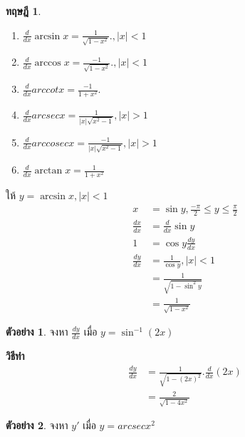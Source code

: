 \documentclass[
]{book}
\newtheorem{theorem}{ทฤษฎี}[chapter]
\theoremstyle{definition}
\theoremstyle{definition}
\newtheorem{example}{ตัวอย่าง}[chapter]
\theoremstyle{definition}
\theoremstyle{definition}
\theoremstyle{remark}
\begin{document}
\begin{theorem}
\leavevmode

\begin{enumerate}
\def\labelenumi{\arabic{enumi}.}
\item
  \(\displaystyle\frac{d}{dx} \arcsin x=\frac{1}{\sqrt{1-x^{2}}}., |x|<1\)
\item
  \(\displaystyle\frac{d}{dx} \arccos x=\frac{-1}{\sqrt{1-x^{2}}}., |x|<1\)
\item
  \(\displaystyle\frac{d}{dx} arccot x=\frac{-1}{1+x^{2}}.\)
\item
  \(\displaystyle\frac{d}{dx} arcsec x=\frac{1}{|x|\sqrt{x^{2}-1}}, |x|>1\)
\item
  \(\displaystyle\frac{d}{dx} arccosec x=\frac{-1}{|x|\sqrt{x^{2}-1}}, |x|>1\)
\item
  \(\displaystyle\frac{d}{dx} \arctan x=\frac{1}{1+x^{2}}\)
\end{enumerate}

\end{theorem}

ให้ \(y=\arcsin x , |x|<1\)\\
\begin{equation}   \begin{aligned}
x&=\sin y, \displaystyle \frac{-\pi}{2}\leq y \leq \frac{\pi}{2}\\
\displaystyle \frac{dx}{dx}&=\frac{d}{dx}\sin y\\
1&=\cos y \displaystyle \frac{dy}{dx}\\
\displaystyle \frac{dy}{dx}&=\frac{1}{\cos y} , |x|<1\\
&=\displaystyle \frac{1}{\sqrt{1-\sin^{2} y}}\\
&=\displaystyle \frac{1}{\sqrt{1-x^{2}}}
  \end{aligned} \end{equation}

\begin{example}
จงหา \(\displaystyle \frac{dy}{dx}\) เมื่อ \(y=\sin^{-1}(2x)\)
\end{example}

\textbf{วิธีทำ} \begin{equation}   \begin{aligned}
 \displaystyle
\frac{dy}{dx}&=\frac{1}{\sqrt{1-(2x)^{2}}}.\frac{d}{dx}(2x)\\
&=\frac{2}{\sqrt{1-4x^{2}}}
  \end{aligned} \end{equation}

\begin{example}
จงหา \(y'\) เมื่อ \(y=arcsec x^{2}\)
\end{example}
\end{document}

